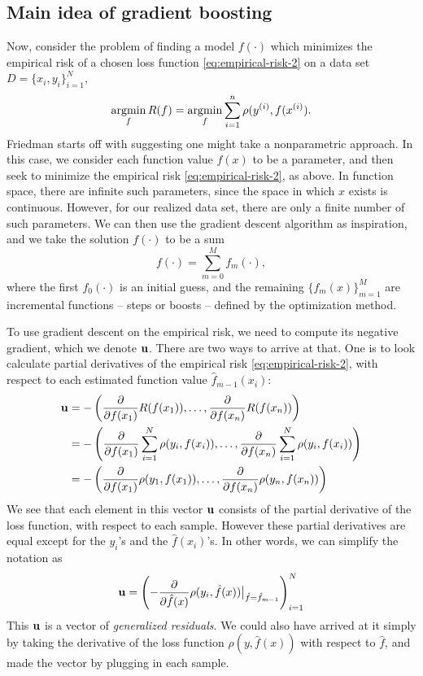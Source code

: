 \subsection{Main idea of gradient boosting}
Now, consider the problem of finding a model $f(\cdot)$ which minimizes the empirical risk of a chosen loss function \eqref{eq:empirical-risk-2} on a data set $D=\{x_i,y_i\}_{i=1}^N$,
\begin{equation}
    \operatorname*{argmin}_{f}R(f)=\operatorname*{argmin}_{f}\sum_{i=1}^n\rho(y^{(i)},f(x^{(i)}).
\end{equation}
Friedman starts off with suggesting one might take a nonparametric approach. In this case, we consider each function value $f(x)$ to be a parameter, and then seek to minimize the empirical risk \eqref{eq:empirical-risk-2}, as above. In function space, there are infinite such parameters, since the space in which $x$ exists is continuous. However, for our realized data set, there are only a finite number of such parameters. We can then use the gradient descent algorithm as inspiration, and we take the solution $f(\cdot)$ to be a sum
\begin{equation}
    f(\cdot)=\sum_{m=0}^M f_m(\cdot),
\end{equation}
where the first $f_0(\cdot)$ is an initial guess, and the remaining $\{f_m(x)\}_{m=1}^M$ are incremental functions -- steps or boosts -- defined by the optimization method.

To use gradient descent on the empirical risk, we need to compute its negative gradient, which we denote $\mathbf{u}$. There are two ways to arrive at that. One is to look calculate partial derivatives of the empirical risk \eqref{eq:empirical-risk-2}, with respect to each estimated function value $\hat{f}_{m-1}(x_i)$:
\begin{align}
    \mathbf{u}&=-\left(\frac{\partial}{\partial f(x_1)}R(f(x_1)),\ldots,\frac{\partial}{\partial f(x_n)}R(f(x_n))\right) \\
    &=-\left(\frac{\partial}{\partial f(x_1)}\sum_{i=1}^N\rho(y_i, f(x_i)),\ldots,\frac{\partial}{\partial f(x_n)}\sum_{i=1}^N\rho(y_i, f(x_i))\right) \\
    &=-\left(\frac{\partial}{\partial f(x_1)}\rho(y_1, f(x_1)),\ldots,\frac{\partial}{\partial f(x_n)}\rho(y_n, f(x_n))\right)
\end{align}
We see that each element in this vector $\mathbf{u}$ consists of the partial derivative of the loss function, with respect to each sample. However these partial derivatives are equal except for the $y_i$'s and the $\hat{f}(x_i)$'s. In other words, we can simplify the notation as
\begin{equation}
    \mathbf{u}=\left(-\frac{\partial}{\partial \hat{f}(x)}\rho(y_i, \hat{f}(x))\big\rvert_{\hat{f}=\hat{f}_{m-1}}\right)_{i=1}^N
\end{equation}
This $\mathbf{u}$ is a vector of \textit{generalized residuals}. We could also have arrived at it simply by taking the derivative of the loss function $\rho(y,\hat{f}(x))$ with respect to $\hat{f}$, and made the vector by plugging in each sample.

